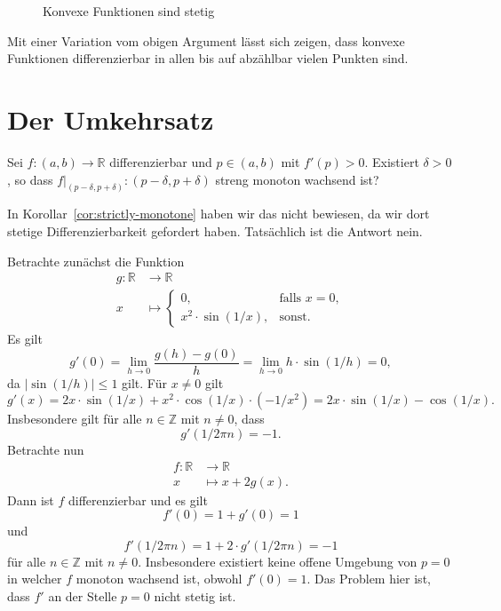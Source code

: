 \documentclass[../main.tex]{subfiles}
\begin{document}
\begin{figure}[htb]
  \centering
  
  \caption{Konvexe Funktionen sind stetig}%
  \label{fig:convex-continuous}
\end{figure}

Mit einer Variation vom obigen Argument lässt sich zeigen,
dass konvexe Funktionen differenzierbar in allen
bis auf abzählbar vielen Punkten sind.

\section{Der Umkehrsatz}
\begin{question}
  Sei $f \colon (a, b) \to \mathbb{R}$ differenzierbar
  und $p \in (a, b)$ mit $f'(p) > 0$.
  Existiert $\delta > 0$, so dass
  $f|_{(p - \delta, p + \delta)} \colon
  (p - \delta, p + \delta)$ streng monoton wachsend ist?
\end{question}

In Korollar~\ref{cor:strictly-monotone} haben wir das
nicht bewiesen, da wir dort stetige
Differenzierbarkeit gefordert haben.
Tatsächlich ist die Antwort nein.

\begin{example}
  Betrachte zunächst die Funktion
  \begin{align*}
    g \colon \mathbb{R} & \to \mathbb{R} \\
    x & \mapsto
    \begin{cases}
      0, & \text{falls $x = 0$}, \\
      x^2 \cdot \sin(1/x), & \text{sonst}.
    \end{cases}
  \end{align*}
Es gilt
\[
  g'(0) = \lim_{h \to 0} \frac{g(h) - g(0)}{h}
  = \lim_{h \to 0} h \cdot \sin(1/h) = 0,
\]
da $|\sin(1/h)| \leq 1$ gilt.
Für $x \neq 0$ gilt
\[
  g'(x) = 2x \cdot \sin(1/x) + x^2 \cdot \cos(1/x) \cdot (-1/x^2)
  = 2x \cdot \sin(1/x) - \cos (1/x).
\]
Insbesondere gilt für alle $n \in \mathbb{Z}$ mit
$n \neq 0$, dass
\[
  g'(1/2\pi n) = -1.
\]
Betrachte nun
\begin{align*}
  f \colon \mathbb{R} & \to \mathbb{R} \\
  x & \mapsto x + 2g(x).
\end{align*}
Dann ist $f$ differenzierbar und es gilt
\[
  f'(0) = 1 + g'(0) = 1
\]
und
\[
  f'(1/2 \pi n) = 1 + 2 \cdot g'(1/ 2 \pi n) = -1
\]
für alle $n \in \mathbb{Z}$ mit $n \neq 0$.
Insbesondere existiert keine offene
Umgebung von $p = 0$ 
in welcher $f$ monoton wachsend ist,
obwohl $f'(0) = 1$.
Das Problem hier ist, dass
$f'$ an der Stelle $p = 0$ nicht stetig ist.
\end{example}
\end{document}
